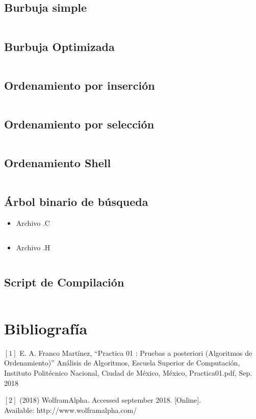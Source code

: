 \documentclass[12pt]{article}
\begin{document}
		\subsection{Burbuja simple}
		    \inputminted{c++}{Code/BurbujaSimple.c}

		\subsection{Burbuja Optimizada}
		    \inputminted{c++}{Code/BurbujaOptimizada.c}
		    \newpage
		\subsection{Ordenamiento por inserción}
			\inputminted{c++}{Code/Insercion.c}
		    
		\subsection{Ordenamiento por selección}
			\inputminted{c++}{Code/Seleccion.c}
		    
		\subsection{Ordenamiento Shell}
			\inputminted{c++}{Code/Shell.c}
		    
		\subsection{Árbol binario de búsqueda}
		\begin{itemize}
		    \item[\checkmark] Archivo .C 
		        \inputminted{c++}{Code/ABB.c}
		    \item[\checkmark] Archivo .H
		        \inputminted{c++}{Code/Arbin.h}
		\end{itemize}
		    
		\subsection{Script de Compilación}
		 \inputminted{c++}{Code/script.c}
			
	
	\section{Bibliografía}
	
	$[1]$ E. A. Franco Martínez, “Practica 01 : Pruebas a posteriori (Algoritmos de Ordenamiento)” Análisis de Algoritmos, Escuela Superior de Computación, Instituto Politécnico Nacional,
    Ciudad de México, México, Practica01.pdf, Sep. 2018
  
    $[2]$ (2018) WolframAlpha. Accessed september 2018. [Online]. \\Available: http://www.wolframalpha.com/

	\nocite{ref2}
	
     
\end{document}
